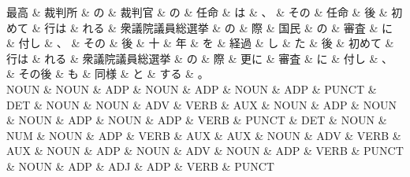 \documentclass[tikz,border=5pt]{standalone}
\begin{document}
\small
\begin{dependency}[edge unit distance=12.0pt]
    \begin{deptext}[column sep=0.5em]
        最高 \& 裁判所 \& の \& 裁判官 \& の \& 任命 \& は \& 、 \& その \& 任命 \& 後 \& 初めて \& 行は \& れる \& 衆議院議員総選挙 \& の \& 際 \& 国民 \& の \& 審査 \& に \& 付し \& 、 \& その \& 後 \& 十 \& 年 \& を \& 経過 \& し \& た \& 後 \& 初めて \& 行は \& れる \& 衆議院議員総選挙 \& の \& 際 \& 更に \& 審査 \& に \& 付し \& 、 \& その後 \& も \& 同様 \& と \& する \& 。\\
        NOUN \& NOUN \& ADP \& NOUN \& ADP \& NOUN \& ADP \& PUNCT \& DET \& NOUN \& NOUN \& ADV \& VERB \& AUX \& NOUN \& ADP \& NOUN \& NOUN \& ADP \& NOUN \& ADP \& VERB \& PUNCT \& DET \& NOUN \& NUM \& NOUN \& ADP \& VERB \& AUX \& AUX \& NOUN \& ADV \& VERB \& AUX \& NOUN \& ADP \& NOUN \& ADV \& NOUN \& ADP \& VERB \& PUNCT \& NOUN \& ADP \& ADJ \& ADP \& VERB \& PUNCT\\
    \end{deptext}
\end{dependency}
\end{document}
